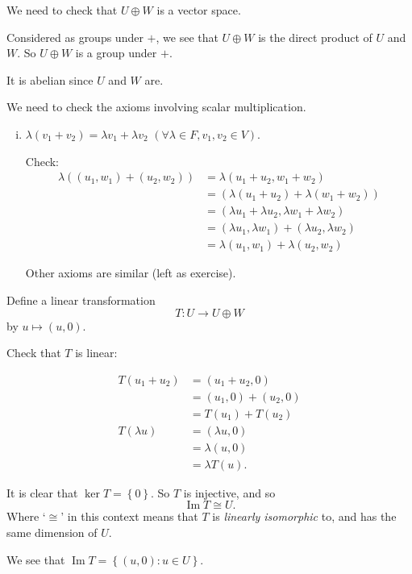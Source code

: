 \documentclass{article}
\theoremstyle{definition} \newtheorem*{definition}{Definition}
\newcommand{\ism}{\cong} \newcommand{\elemt}[2]{#1_{{#2}\sigma(#2)}}
\DeclareMathOperator{\Ima}{Im} \DeclareMathOperator{\Sym}{Sym}
\begin{document}
We need to check that $U \oplus W$ is a vector space.

Considered as groups under $+$, we see that $U \oplus W$ is the direct
product of $U$ and $W$. So  $U \oplus W$ is a group under $+$.

It is abelian since $U$ and $W$ are.

We need to check the axioms involving scalar multiplication.

\begin{enumerate}[(i)]
  \item $\lambda (v_1 + v_2) = \lambda v_1 + \lambda v_2$ $(\forall \lambda \in F, v_1, v_2 \in V)$.

    Check: 
    \begin{align*}
    \lambda \left( (u_1,w_1) + (u_2,w_2) \right) &=
    \lambda \left( u_1 + u_2, w_1 + w_2 \right) \\
    &= \left( \lambda (u_1 + u_2) + \lambda(w_1 + w_2) \right) \\
    &= \left( \lambda u_1 + \lambda u_2, \lambda w_1 + \lambda w_2 \right)\\
&= (\lambda u_1, \lambda w_1) + (\lambda u_2, \lambda w_2) \\
&= \lambda (u_1, w_1) + \lambda (u_2, w_2)
    \end{align*}

    Other axioms are similar (left as exercise).

\end{enumerate}

Define a linear transformation 
\[
  T :U \rightarrow U \oplus W
\]
by $u \mapsto (u, 0)$.

Check that $T$ is linear:

\begin{align*}
  T(u_1 + u_2) &= (u_1 + u_2, 0) \\
  &= (u_1, 0) + (u_2, 0) \\
  &= T(u_1) + T(u_2) \\
  T(\lambda u) &= (\lambda u, 0) \\
  &= \lambda (u, 0) \\
  &= \lambda T (u).
\end{align*}

It is clear that $\ker T = \left\{ 0 \right\}$. So $T$ is injective,
and so \[\Ima T \ism U.\]
Where `$\ism$' in this context means that $T$ is \emph{linearly isomorphic} to,
and has the same dimension of $U$.

We see that $\Ima T = \left\{ (u,0) : u  \in U \right\}$.
\end{document}
